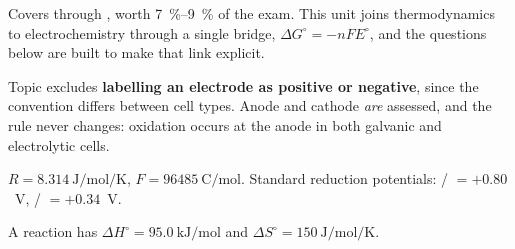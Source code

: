 \documentclass{apchem-exam}
\begin{document}
\apctitleblock

\begin{apcnote}
Covers  through , worth
\SI{7}{\percent}--\SI{9}{\percent} of the exam. This unit joins
thermodynamics to electrochemistry through a single bridge,
$\Delta G^\circ = -nFE^\circ$, and the questions below are built to make
that link explicit.

Topic  excludes \textbf{labelling an electrode as positive or
negative}, since the convention differs between cell types. Anode and
cathode \emph{are} assessed, and the rule never changes: oxidation occurs
at the anode in both galvanic and electrolytic cells.

$R = \SI{8.314}{\joule\per\mole\per\kelvin}$,
$F = \SI{96485}{\coulomb\per\mole}$. Standard reduction potentials:
/ $= +0.80$~V, / $= +0.34$~V.
\end{apcnote}



A reaction has $\Delta H^\circ = \SI{+95.0}{\kilo\joule\per\mole}$ and
$\Delta S^\circ = \SI{+150}{\joule\per\mole\per\kelvin}$.
\end{document}

